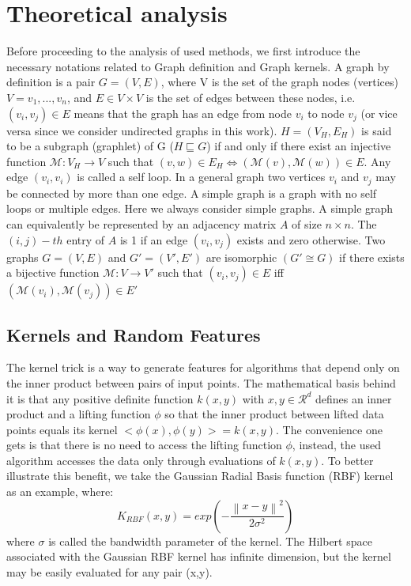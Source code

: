 \addchapheadtotoc
\chapter{Theoretical analysis}
Before proceeding to the analysis of used methods, we first introduce the necessary notations related to Graph definition and Graph kernels.
A graph by definition is a pair $G=(V,E)$, where V is the set of the graph nodes (vertices) $V={v_1,...,v_n}$, and $E\in V\times V$ is the set of edges between these nodes, i.e. $(v_i, v_j)\in E$ means that the graph has an edge from node $v_i$ to node $v_j$ (or vice versa since we consider undirected graphs in this work).
\newline $H=(V_H,E_H)$ is said to be a subgraph (graphlet) of G ($H\sqsubseteq G$) if and only if there exist an injective function $\mathcal{M}:V_H\xrightarrow{} V$ such that $(v,w)\in E_H \Leftrightarrow{(\mathcal{M}(v),\mathcal{M}(w))\in E}$.\newline
Any edge $(v_i, v_i)$ is called a self loop. In a general graph two vertices $v_i$ and $v_j$ may be connected by more than
one edge. A simple graph is a graph with no self loops
or multiple edges. Here we always consider simple graphs.\newline
A simple graph can equivalently be represented by an adjacency matrix $A$ of size $n \times n$. The $(i,j)-th$ entry of $A$ is 1 if an edge $(v_i, v_j)$ exists and zero otherwise.\newline
Two graphs $G=(V,E)$ and $G'=(V',E')$ are isomorphic $(G'\cong G)$ if there exists a bijective function $\mathcal{M}:V\xrightarrow{} V'$ such that $(v_i,v_j)\in E$ iff $(\mathcal{M}(v_i),\mathcal{M}(v_j))\in E'$


\section{Kernels and Random Features}
The kernel trick is a way to generate features for algorithms that depend only on the inner product between pairs of input points. The mathematical basis behind it is that any positive definite function $k(x,y)$ with $x,y \in \mathcal{R}^d$ defines an inner product and a lifting function $\phi$ so that the inner product between lifted data points equals its kernel $<\phi(x),\phi(y)>=k(x,y)$. The convenience one gets is that there is no need to access the lifting function $\phi$, instead, the used algorithm accesses the data only through evaluations of $k(x,y)$. To better illustrate this benefit, we take the Gaussian Radial Basis function (RBF) kernel as an example, where:
\begin{equation}
    K_{RBF}(x,y)=exp(-\frac{\left \| x-y\right\|^2}{2\sigma^2})
\end{equation}
where $\sigma$ is called the bandwidth parameter of the kernel. The Hilbert space associated with the Gaussian RBF kernel has infinite dimension, but the kernel may be easily evaluated for any pair (x,y). 

